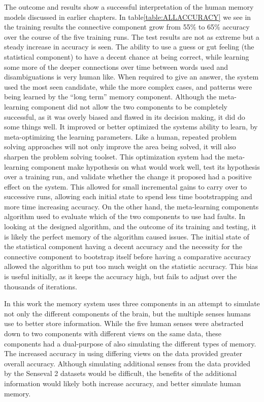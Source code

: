 The outcome and results show a successful interpretation of the human memory models discussed in earlier chapters. In table\ref{table:ALLACCURACY} we see in the training results the connective component grow from 55\% to 65\% accuracy over the course of the five training runs. The test results are not as extreme but a steady increase in accuracy is seen.  The ability to use a guess or gut feeling (the statistical component) to have a decent chance at being correct, while learning some more of the deeper connections over time between words used and disambiguations is very human like.  When required to give an answer, the system used the most seen candidate, while the more complex cases, and patterns were being learned by the ``long term'' memory component.  Although the meta-learning component did not allow the two components to be completely successful, as it was overly biased and flawed in its decision making, it did do some things well. It improved or better optimized the systems ability to learn, by meta-optimizing the learning parameters. Like a human, repeated problem solving approaches will not only improve the area being solved, it will also sharpen the problem solving toolset. This optimization system had the meta-learning component make hypothesis on what would work well, test its hypothesis over a training run, and validate whether the change it proposed had a positive effect on the system. This allowed for small incremental gains to carry over to successive runs, allowing each initial state to spend less time bootstrapping and more time increasing accuracy. On the other hand, the meta-learning components algorithm used to evaluate which of the two components to use had faults.  In looking at the designed algorithm, and the outcome of its training and testing, it is likely the perfect memory of the algorithm caused issues.  The initial state of the statistical component having a decent accuracy and the necessity for the connective component to bootstrap itself before having a comparative accuracy allowed the algorithm to put too much weight on the statistic accuracy.  This bias is useful initially, as it keeps the accuracy high, but fails to adjust over the thousands of iterations.

In this work the memory system uses three components in an attempt to simulate not only the different components of the brain, but the multiple senses humans use to better store information. While the five human senses were abstracted down to two components with different views on the same data, these components had a dual-purpose of also simulating the different types of memory.  The increased accuracy in using differing views on the data provided greater overall accuracy. Although simulating additional senses from the data provided by the Senseval 2 datasets would be difficult, the benefits of the additional information would likely both increase accuracy, and better simulate human memory.

